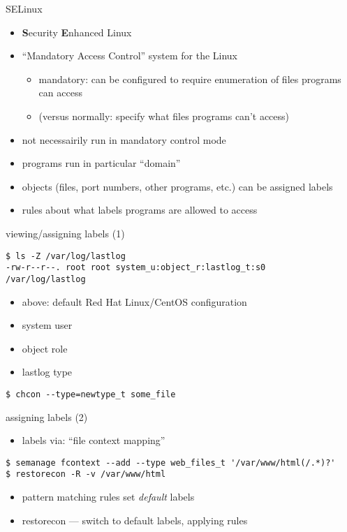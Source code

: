 \begin{frame}{SELinux}
    \begin{itemize}
    \item \textbf{S}ecurity \textbf{E}nhanced Linux
    \item ``Mandatory Access Control'' system for the Linux
        \begin{itemize}
        \item mandatory: can be configured to require enumeration of files programs can access
        \item (versus normally: specify what files programs can't access)
        \end{itemize}
    \item not necessairily run in mandatory control mode
    \vspace{.5cm}
    \item programs run in particular ``domain''
    \item objects (files, port numbers, other programs, etc.) can be assigned labels
    \item rules about what labels programs are allowed to access
    \end{itemize}
\end{frame}

\begin{frame}[fragile,label=selinuxLabels1]{viewing/assigning labels (1)}
\begin{Verbatim}[fontsize=\small]
$ ls -Z /var/log/lastlog
-rw-r--r--. root root system_u:object_r:lastlog_t:s0   /var/log/lastlog
\end{Verbatim}
\begin{itemize}
\item above: default Red Hat Linux/CentOS configuration
\item system user
\item object role
\item lastlog type
\end{itemize}
\begin{Verbatim}[fontsize=\small]
$ chcon --type=newtype_t some_file
\end{Verbatim}
\end{frame}

\begin{frame}[fragile,label=selinuxLabels2]{assigning labels (2)}
\begin{itemize}
\item labels via: ``file context mapping''
\end{itemize}
\begin{Verbatim}[fontsize=\small]
$ semanage fcontext --add --type web_files_t '/var/www/html(/.*)?'
$ restorecon -R -v /var/www/html
\end{Verbatim}
\begin{itemize}
\item pattern matching rules set \textit{default} labels
\item restorecon --- switch to default labels, applying rules
\end{itemize}
\end{frame}

